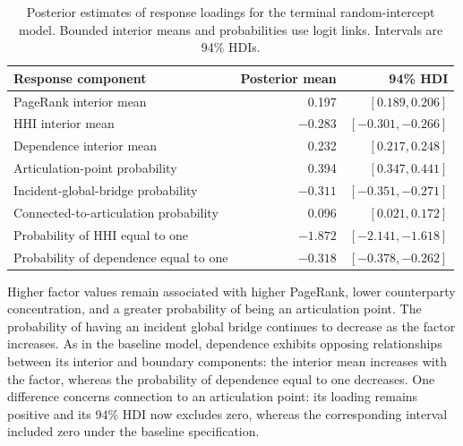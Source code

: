 \documentclass[pdftex,12pt,openright,a4paper,oneside]{book}
\begin{document}
\begin{table}[htbp]
\centering
\caption{Posterior estimates of response
loadings for the terminal random-intercept
model. Bounded interior means and
probabilities use logit links.
Intervals are 94\% HDIs.}
\label{tab:node_terminal_loadings}
\small
\begin{tabular}{lrr}
\hline
Response component & Posterior mean & 94\% HDI \\
\hline
PageRank interior mean
& 0.197 & $[0.189,0.206]$ \\
HHI interior mean
& $-0.283$ & $[-0.301,-0.266]$ \\
Dependence interior mean
& 0.232 & $[0.217,0.248]$ \\
Articulation-point probability
& 0.394 & $[0.347,0.441]$ \\
Incident-global-bridge probability
& $-0.311$ & $[-0.351,-0.271]$ \\
Connected-to-articulation probability
& 0.096 & $[0.021,0.172]$ \\
Probability of HHI equal to one
& $-1.872$ & $[-2.141,-1.618]$ \\
Probability of dependence equal to one
& $-0.318$ & $[-0.378,-0.262]$ \\
\hline
\end{tabular}
\end{table}
Higher factor values remain associated
with higher PageRank, lower counterparty
concentration, and a greater probability
of being an articulation point.
The probability of having an incident
global bridge continues to decrease
as the factor increases.
As in the baseline model, dependence
exhibits opposing relationships between
its interior and boundary components:
the interior mean increases with the
factor, whereas the probability of
dependence equal to one decreases.
One difference concerns connection to an articulation point: 
its loading remains positive and its
94\% HDI now excludes zero, whereas
the corresponding interval included
zero under the baseline specification.
\end{document}
